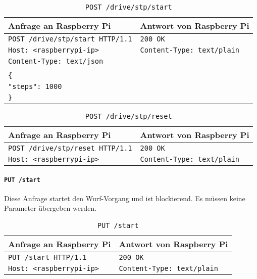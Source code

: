 \begin{table}[h!]
	\centering
	\begin{tabular}{|l|l|}
		\hline Anfrage an Raspberry Pi & Antwort von Raspberry Pi \\ 
		\hline \texttt{POST /drive/stp/start HTTP/1.1} & \texttt{200 OK} \\
		\texttt{Host: <raspberrypi-ip>} & \texttt{Content-Type: text/plain} \\
		\texttt{Content-Type: text/json} & \\
		& \\
		\verb|{| & \\
		\verb|"steps": 1000| & \\
		\verb|}|& \\
		\hline 
	\end{tabular} 
	\caption{\texttt{POST /drive/stp/start}}
	\label{tab:post-drive-stp-start}
\end{table}

\begin{table}[h!]
	\centering
	\begin{tabular}{|l|l|}
		\hline Anfrage an Raspberry Pi & Antwort von Raspberry Pi \\ 
		\hline \texttt{POST /drive/stp/reset HTTP/1.1} & \texttt{200 OK} \\
		\texttt{Host: <raspberrypi-ip>} & \texttt{Content-Type: text/plain} \\
		\hline 
	\end{tabular} 
	\caption{\texttt{POST /drive/stp/reset}}
	\label{tab:post-drive-stp-reset}
\end{table}

\paragraph{\texttt{PUT /start}}

Diese Anfrage startet den Wurf-Vorgang und ist blockierend. Es müssen keine Parameter übergeben werden.

\begin{table}[h!]
	\centering
	\begin{tabular}{|l|l|}
		\hline Anfrage an Raspberry Pi & Antwort von Raspberry Pi \\ 
		\hline \texttt{PUT /start HTTP/1.1} & \texttt{200 OK} \\
		\texttt{Host: <raspberrypi-ip>} & \texttt{Content-Type: text/plain} \\
		\hline 
	\end{tabular} 
	\caption{\texttt{PUT /start}}
	\label{tab:put-start}
\end{table}

